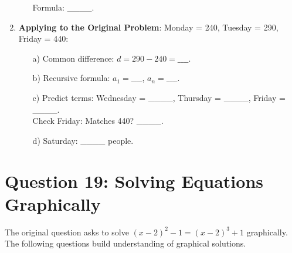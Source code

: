 \documentclass[12pt]{article}
\begin{document}
\begin{enumerate}[label=18.\arabic*]
\begin{enumerate}
        Formula: \_\_\_\_.
    \end{enumerate}
    \item \textbf{Applying to the Original Problem}: Monday = 240, Tuesday = 290, Friday = 440:
    \begin{enumerate}
        \item[a)] Common difference: \( d = 290 - 240 = \_\_\_\_ \).
        \item[b)] Recursive formula: \( a_1 = \_\_\_\_ \), \( a_n = \_\_\_\_ \).
        \item[c)] Predict terms: Wednesday = \_\_\_\_, Thursday = \_\_\_\_, Friday = \_\_\_\_. \\
        Check Friday: Matches 440? \_\_\_\_.
        \item[d)] Saturday: \_\_\_\_ people.
    \end{enumerate}
\end{enumerate}

\section*{Question 19: Solving Equations Graphically}
The original question asks to solve \( (x - 2)^2 - 1 = (x - 2)^3 + 1 \) graphically. The following questions build understanding of graphical solutions.
\end{document}
